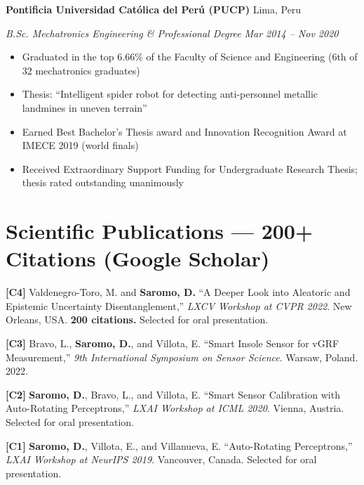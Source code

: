 \documentclass[11pt,letterpaper]{article}
\newcommand{\entry}[4]{%
  \noindent\textbf{#1} \hfill #2 \par\nopagebreak
  \textit{#3} \hfill \textit{#4} \par\nopagebreak
}
\begin{document}
\entry{Pontificia Universidad Cat\'{o}lica del Per\'{u} (PUCP)}{Lima, Peru}{B.Sc. Mechatronics Engineering \& Professional Degree}{Mar 2014 -- Nov 2020}
\begin{itemize}
  \item Graduated in the top 6.66\% of the Faculty of Science and Engineering (6th of 32 mechatronics graduates)
  \item Thesis: ``Intelligent spider robot for detecting anti-personnel metallic landmines in uneven terrain''
  \item Earned Best Bachelor's Thesis award and Innovation Recognition Award at IMECE 2019 (world finals)
  \item Received Extraordinary Support Funding for Undergraduate Research Thesis; thesis rated outstanding unanimously
\end{itemize}
\vspace{0.3em}

\section{Scientific Publications --- 200+ Citations (Google Scholar)}

\noindent\textbf{[C4]} Valdenegro-Toro, M. and \textbf{Saromo, D.} ``A Deeper Look into Aleatoric and Epistemic Uncertainty Disentanglement,'' \textit{LXCV Workshop at CVPR 2022}. New Orleans, USA. \textbf{200 citations.} Selected for oral presentation.\par\vspace{3pt}

\noindent\textbf{[C3]} Bravo, L., \textbf{Saromo, D.}, and Villota, E. ``Smart Insole Sensor for vGRF Measurement,'' \textit{9th International Symposium on Sensor Science}. Warsaw, Poland. 2022.\par\vspace{3pt}

\noindent\textbf{[C2]} \textbf{Saromo, D.}, Bravo, L., and Villota, E. ``Smart Sensor Calibration with Auto-Rotating Perceptrons,'' \textit{LXAI Workshop at ICML 2020}. Vienna, Austria. Selected for oral presentation.\par\vspace{3pt}

\noindent\textbf{[C1]} \textbf{Saromo, D.}, Villota, E., and Villanueva, E. ``Auto-Rotating Perceptrons,'' \textit{LXAI Workshop at NeurIPS 2019}. Vancouver, Canada. Selected for oral presentation.\par\vspace{3pt}
\end{document}

